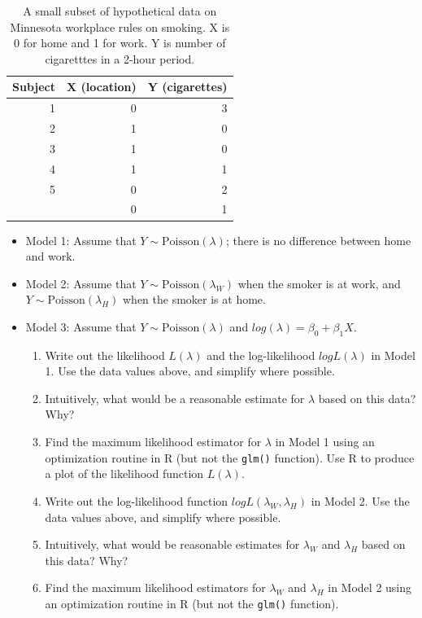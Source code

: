 \documentclass[
]{krantz}
\providecommand{\tightlist}{%
  \setlength{\itemsep}{0pt}\setlength{\parskip}{0pt}}
\begin{document}
\begin{table}[t]

\caption{\label{tab:ex3chp4}A small subset of hypothetical data on Minnesota workplace rules on smoking.  X is 0 for home and 1 for work.  Y is number of cigaretttes in a 2-hour period.}
\centering
\begin{tabular}{rrr}
\toprule
Subject & X (location) & Y (cigarettes)\\
\midrule
1 & 0 & 3\\
2 & 1 & 0\\
3 & 1 & 0\\
4 & 1 & 1\\
5 & 0 & 2\\
\addlinespace
6 & 0 & 1\\
\bottomrule
\end{tabular}
\end{table}

\begin{itemize}
\item
  Model 1: Assume that \(Y \sim \textrm{Poisson}(\lambda)\); there is no difference between home and work.
\item
  Model 2: Assume that \(Y \sim \textrm{Poisson}(\lambda_W)\) when the smoker is at work, and \(Y \sim \textrm{Poisson}(\lambda_H)\) when the smoker is at home.
\item
  Model 3: Assume that \(Y \sim \textrm{Poisson}(\lambda)\) and \(log(\lambda)=\beta_0+\beta_1X\).

  \begin{enumerate}
  \def\labelenumi{\alph{enumi}.}
  \tightlist
  \item
    Write out the likelihood \(L(\lambda)\) and the log-likelihood \(logL(\lambda)\) in Model 1. Use the data values above, and simplify where possible.
  \item
    Intuitively, what would be a reasonable estimate for \(\lambda\) based on this data? Why?
  \item
    Find the maximum likelihood estimator for \(\lambda\) in Model 1 using an optimization routine in R (but not the \texttt{glm()} function). Use R to produce a plot of the likelihood function \(L(\lambda)\).
  \item
    Write out the log-likelihood function \(logL(\lambda_W, \lambda_H)\) in Model 2. Use the data values above, and simplify where possible.
  \item
    Intuitively, what would be reasonable estimates for \(\lambda_W\) and \(\lambda_H\) based on this data? Why?
  \item
    Find the maximum likelihood estimators for \(\lambda_W\) and \(\lambda_H\) in Model 2 using an optimization routine in R (but not the \texttt{glm()} function).
  \end{enumerate}
\end{itemize}
\end{document}
